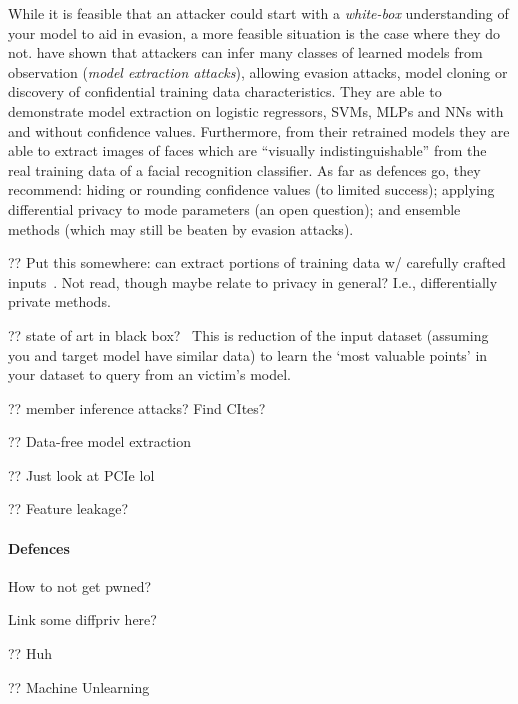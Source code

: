While it is feasible that an attacker could start with a \emph{white-box} understanding of your model to aid in evasion, a more feasible situation is the case where they do not.
\textcite{DBLP:conf/uss/TramerZJRR16} have shown that attackers can infer many classes of learned models from observation (\emph{model extraction attacks}), allowing evasion attacks, model cloning or discovery of confidential training data characteristics.
They are able to demonstrate model extraction on logistic regressors, SVMs, MLPs and NNs with and without confidence values.
Furthermore, from their retrained models they are able to extract images of faces which are ``visually indistinguishable'' from the real training data of a facial recognition classifier.
As far as defences go, they recommend: hiding or rounding confidence values (to limited success); applying differential privacy to mode parameters (an open question); and ensemble methods (which may still be beaten by evasion attacks).

?? Put this somewhere: can extract portions of training data w/ carefully crafted inputs~\parencite{DBLP:journals/corr/abs-2012-07805}. Not read, though maybe relate to privacy in general? I.e., differentially private methods.

?? state of art in black box?~\parencite{DBLP:conf/uss/HeM0HH21}
This is reduction of the input dataset (assuming you and target model have similar data) to learn the `most valuable points' in your dataset to query from an victim's model.

?? member inference attacks? Find CItes?~\parencite{DBLP:conf/sp/ShokriSSS17}

?? Data-free model extraction~\parencite{DBLP:conf/cvpr/TruongMWP21}

?? Just look at PCIe lol~\parencite{DBLP:conf/uss/ZhuCZL21}

?? Feature leakage?~\parencite{DBLP:conf/sp/MelisSCS19}

\paragraph{Defences}
How to not get pwned?

Link some diffpriv here?~\parencite{DBLP:conf/ccs/AbadiCGMMT016}

?? Huh~\parencite{DBLP:journals/corr/abs-2103-07101}

?? Machine Unlearning~\parencite{DBLP:conf/sp/BourtouleCCJTZL21}
